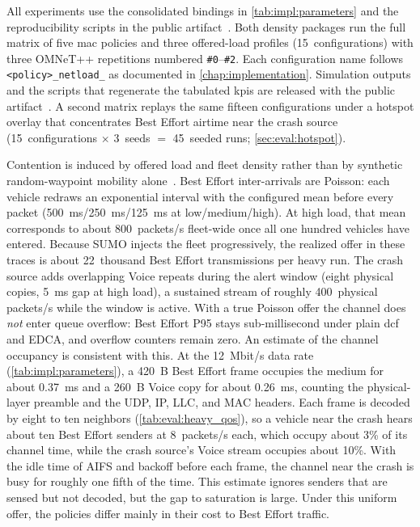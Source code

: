 All experiments use the consolidated bindings in \autoref{tab:impl:parameters} and the reproducibility scripts in the public artifact~\cite{aguiar2026_veins_qos}.
Both density packages run the full matrix of five \gls{mac} policies and three offered-load profiles (15~configurations) with three OMNeT++ repetitions numbered \texttt{\#0}--\texttt{\#2}.
Each configuration name follows \texttt{<policy>\_netload\_<low|medium|high>} as documented in \autoref{chap:implementation}.
Simulation outputs and the scripts that regenerate the tabulated \glspl{kpi} are released with the public artifact~\cite{aguiar2026_veins_qos}.
A second matrix replays the same fifteen configurations under a hotspot overlay that concentrates Best Effort airtime near the crash source (15~configurations $\times$ 3~seeds $=$ 45~seeded runs; \autoref{sec:eval:hotspot}).

Contention is induced by offered load and fleet density rather than by synthetic random-waypoint mobility alone~\cite{veins_sommer2011}.
Best Effort inter-arrivals are Poisson: each vehicle redraws an exponential interval with the configured mean before every packet (\SI{500}{\milli\second}/\SI{250}{\milli\second}/\SI{125}{\milli\second} at low/medium/high).
At high load, that mean corresponds to about 800~packets/s fleet-wide once all one hundred vehicles have entered.
Because SUMO injects the fleet progressively, the realized offer in these traces is about 22~thousand Best Effort transmissions per heavy run.
The crash source adds overlapping Voice repeats during the alert window (eight physical copies, \SI{5}{\milli\second} gap at high load), a sustained stream of roughly 400~physical packets/s while the window is active.
With a true Poisson offer the channel does \emph{not} enter queue overflow: Best Effort P95 stays sub-millisecond under plain \gls{dcf} and EDCA, and overflow counters remain zero.
An estimate of the channel occupancy is consistent with this.
At the 12~Mbit/s data rate (\autoref{tab:impl:parameters}), a 420~B Best Effort frame occupies the medium for about 0.37~ms and a 260~B Voice copy for about 0.26~ms, counting the physical-layer preamble and the UDP, IP, LLC, and MAC headers.
Each frame is decoded by eight to ten neighbors (\autoref{tab:eval:heavy_qos}), so a vehicle near the crash hears about ten Best Effort senders at 8~packets/s each, which occupy about 3\% of its channel time, while the crash source's Voice stream occupies about 10\%.
With the idle time of AIFS and backoff before each frame, the channel near the crash is busy for roughly one fifth of the time.
This estimate ignores senders that are sensed but not decoded, but the gap to saturation is large.
Under this uniform offer, the policies differ mainly in their cost to Best Effort traffic.

